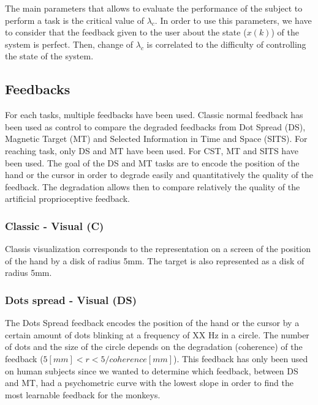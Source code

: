 \documentclass[preprint,12pt]{elsarticle}
\begin{document}
The main parameters that allows to evaluate the performance of the subject to perform a task is the critical value of $\lambda_c$. In order to use this parameters, we have to consider that the feedback given to the user about the state ($x(k)$) of the system is perfect. Then, change of $\lambda_c$ is correlated to the difficulty of controlling the state of the system.
\subsection{Feedbacks}
For each tasks, multiple feedbacks have been used. Classic normal feedback has been used as control to compare the degraded feedbacks from Dot Spread (DS), Magnetic Target (MT) and Selected Information in Time and Space (SITS). For reaching task, only DS and MT have been used. For CST, MT and SITS have been used. The goal of the DS and MT tasks are to encode the position of the hand or the cursor in order to degrade easily and quantitatively the quality of the feedback. The degradation allows then to compare relatively the quality of the artificial proprioceptive feedback.
\subsubsection{Classic - Visual (C)}
Classis visualization corresponds to the representation on a screen of the position of the hand by a disk of radius 5mm. The target is also represented as a disk of radius 5mm.
\subsubsection{Dots spread - Visual (DS)}
The Dots Spread feedback encodes the position of the hand or the cursor by a certain amount of dots blinking at a frequency of XX Hz in a circle. The number of dots and the size of the circle depends on the degradation (coherence) of the feedback ($ 5 [mm] < r <5/coherence [mm]$). This feedback has only been used on human subjects since we wanted to determine which feedback, between DS and MT, had a psychometric curve with the lowest slope in order to find the most learnable feedback for the monkeys.
\end{document}
